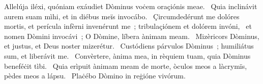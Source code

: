 { Allelúja}
{%
iléxi, quóniam exáudiet Dòminus voċem oraçiónis meae. 
~Quia inclinávit aurem suam mìhi, et in diébus meïs invocábo. 
~Çircumdedérunt me dolóres mortis, et perícula infèrni invenérunt me~; tribulaçiónem et dolórem invóni, 
~et nomen Dòmini invocávi~; O Dòmine, líbera ànimam meam. 
~Mizèricors Dòminus, et justus, et Deus noster mizerétur. 
~Custódiens párvulos Dòminus~; humiliátus sum, et liberávit me. 
~Convèrtere, ànima mea, in rèquiem tuam, quia Dòminus beneféċit tìbi. 
~Quia erìpuit ànimam meam de morte, òculos meos a làcrymïs, pèdes meos a lápsu. 
~Plaċébo Dòmino in reġióne vivórum. 
}
